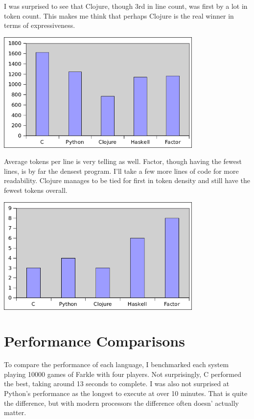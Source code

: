 \documentclass{article}
\begin{document}
I was surprised to see that Clojure, though 3rd in line count, was first by a
lot in token count.  This makes me think that perhaps Clojure is the real winner
in terms of expressiveness.

\includegraphics[width=4in]{graphs/total-tokens.png}

Average tokens per line is very telling as well.  Factor, though having the
fewest lines, is by far the densest program.  I'll take a few more lines of code
for more readability.  Clojure manages to be tied for first in token density and
still have the fewest tokens overall.

\includegraphics[width=4in]{graphs/average-tokens-per-line.png}

\section{Performance Comparisons}

To compare the performance of each language, I benchmarked each system playing
10000 games of Farkle with four players.  Not surprisingly, C performed the
best, taking around 13 seconds to complete.  I was also not surprised at
Python's performance as the longest to execute at over 10 minutes.  That is
quite the difference, but with modern processors the difference often doesn'
actually matter.
\end{document}
